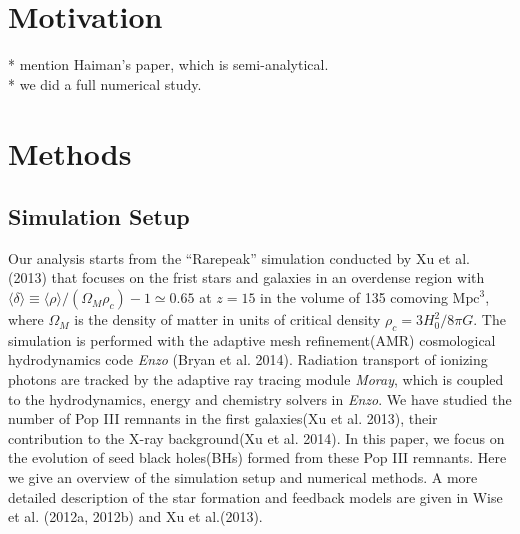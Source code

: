 \documentclass[useAMS,usenatbib]{mn2e}
\begin{document}
\section{Motivation}

* mention Haiman's paper, which is semi-analytical. \\

* we did a full numerical study. \\

\section{Methods}

\subsection{Simulation Setup}
Our analysis starts from the ``Rarepeak'' simulation conducted by Xu et al.
(2013) that focuses on the frist stars and galaxies in an overdense region with 
$\langle\delta\rangle \equiv \langle\rho\rangle/(\Omega_M\rho_c)-1\simeq 0.65$
at $z=15$ in the volume of 135 comoving $\mbox{Mpc}^3$, where $\Omega_M$ is the density
of matter in units of critical density $\rho_c = 3H^2_0/8\pi G$. The simulation
is performed with the adaptive mesh refinement(AMR) cosmological hydrodynamics
code \textit{Enzo} (Bryan et al. 2014). Radiation transport of ionizing photons are
tracked by the adaptive ray tracing module \textit{Moray}, which is coupled to the
hydrodynamics, energy and chemistry solvers in \textit{Enzo}. We have studied the
number of Pop III remnants in the first galaxies(Xu et al. 2013), their
contribution to the X-ray background(Xu et al. 2014). In this paper, we focus on
the evolution of seed black holes(BHs) formed from these Pop III remnants. 
Here we give an overview of the simulation setup and numerical methods. A more 
detailed description of the star formation and feedback models are given in 
Wise et al. (2012a, 2012b) and Xu et al.(2013).\\
\end{document}
